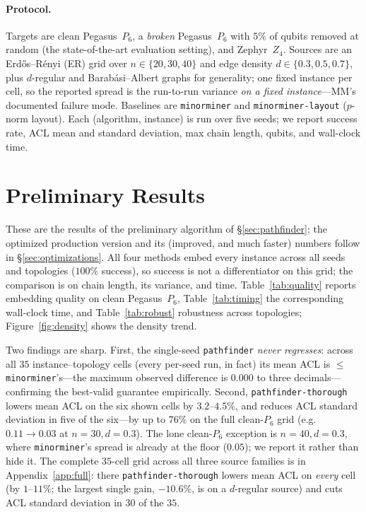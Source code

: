 \documentclass[acmsmall,anonymous,nonacm]{acmart}
\begin{document}
\paragraph{Protocol.}
Targets are clean Pegasus~$P_6$, a \emph{broken} Pegasus~$P_6$ with $5\%$ of
qubits removed at random (the state-of-the-art evaluation setting), and
Zephyr~$Z_4$. Sources are an Erd\H{o}s--R\'enyi (ER) grid over
$n\in\{20,30,40\}$ and edge density $d\in\{0.3,0.5,0.7\}$, plus $d$-regular and
Barab\'asi--Albert graphs for generality; one fixed instance per cell, so the
reported spread is the run-to-run variance \emph{on a fixed instance}---MM's
documented failure mode. Baselines are \texttt{minorminer} and
\texttt{minorminer-layout} ($p$-norm layout). Each (algorithm, instance) is run
over five seeds; we report success rate, ACL mean and standard deviation, max
chain length, qubits, and wall-clock time.

\section{Preliminary Results}
\label{sec:results}

These are the results of the preliminary algorithm of \S\ref{sec:pathfinder};
the optimized production version and its (improved, and much faster) numbers
follow in \S\ref{sec:optimizations}. All four methods embed every instance across
all seeds and topologies ($100\%$ success), so success is not a differentiator on
this grid; the
comparison is on chain length, its variance, and time. Table~\ref{tab:quality}
reports embedding quality on clean Pegasus~$P_6$, Table~\ref{tab:timing} the
corresponding wall-clock time, and Table~\ref{tab:robust} robustness across
topologies; Figure~\ref{fig:density} shows the density trend.

Two findings are sharp. First, the single-seed \texttt{pathfinder} \emph{never
regresses}: across all $35$ instance--topology cells (every per-seed run, in
fact) its mean ACL is $\le$ \texttt{minorminer}'s---the maximum observed
difference is $0.000$ to three decimals---confirming the best-valid guarantee
empirically. Second, \texttt{pathfinder-thorough} lowers mean ACL on the six
shown cells by $3.2$--$4.5\%$, and reduces ACL standard deviation in five of the
six---by up to $76\%$ on the full clean-$P_6$ grid (e.g.\
$0.11\!\to\!0.03$ at $n{=}30,d{=}0.3$). The lone clean-$P_6$ exception is
$n{=}40,d{=}0.3$, where \texttt{minorminer}'s spread is already at the floor
($0.05$); we report it rather than hide it. The complete $35$-cell grid across
all three source families is in Appendix~\ref{app:full}: there
\texttt{pathfinder-thorough} lowers mean ACL on \emph{every} cell (by
$1$--$11\%$; the largest single gain, $-10.6\%$, is on a $d$-regular source) and
cuts ACL standard deviation in $30$ of the $35$.
\end{document}
